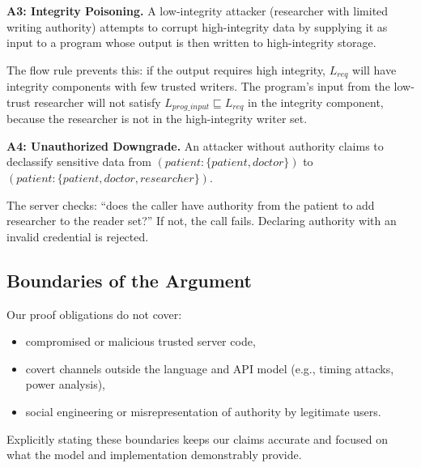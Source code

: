 \textbf{A3: Integrity Poisoning.} A low-integrity attacker (researcher with limited writing authority) attempts to corrupt high-integrity data by supplying it as input to a program whose output is then written to high-integrity storage.

The flow rule prevents this: if the output requires high integrity, $L_{req}$ will have integrity components with few trusted writers. The program's input from the low-trust researcher will not satisfy $L_{prog\_input} \sqsubseteq L_{req}$ in the integrity component, because the researcher is not in the high-integrity writer set. \checkmark

\textbf{A4: Unauthorized Downgrade.} An attacker without authority claims to declassify sensitive data from $(patient:\{patient,doctor\})$ to $(patient:\{patient,doctor,researcher\})$.

The server checks: ``does the caller have authority from the patient to add researcher to the reader set?'' If not, the call fails. Declaring authority with an invalid credential is rejected. \checkmark

\subsection{Boundaries of the Argument}

Our proof obligations do not cover:
\begin{itemize}
    \item compromised or malicious trusted server code,
    \item covert channels outside the language and API model (e.g., timing attacks, power analysis),
    \item social engineering or misrepresentation of authority by legitimate users.
\end{itemize}

Explicitly stating these boundaries keeps our claims accurate and focused on what the model and implementation demonstrably provide.

